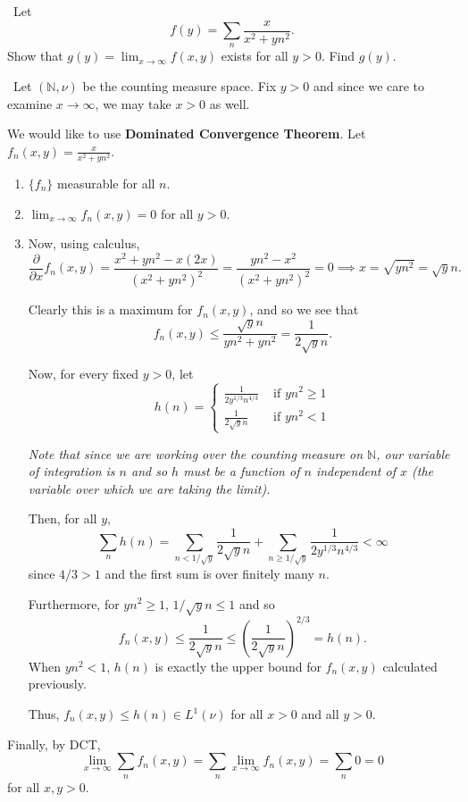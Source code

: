 \documentclass[12pt]{Homework}
\begin{document}
\begin{problem} $\,$
Let $$f(y)=\sum_n\frac{x}{x^2+yn^2}.$$ Show that $g(y)=\lim_{x\to\infty}f(x,y)$ exists for all $y>0$. Find $g(y)$.
\end{problem}


\begin{solution}$\,$
Let $(\mathbb{N},\nu)$ be the counting measure space. Fix $y>0$ and since we care to examine $x\to\infty$, we may take $x>0$ as well. 

We would like to use \textbf{Dominated Convergence Theorem}. Let $f_n(x,y)=\frac{x}{x^2+yn^2}$.
\begin{enumerate}
    \item $\{f_n\}$ measurable for all $n.$
    \item $\lim_{x\to\infty}f_n(x,y)= 0$ for all $y>0$.
    \item Now, using calculus, $$\frac{\partial}{\partial x}f_n(x,y)=\frac{x^2+yn^2-x(2x)}{(x^2+yn^2)^2}=\frac{yn^2-x^2}{(x^2+yn^2)^2}=0\implies x=\sqrt{yn^2}=\sqrt{y}n.$$
    
    Clearly this is a maximum for $f_n(x,y)$, and so we see that $$f_n(x,y)\le \frac{\sqrt{y}n}{yn^2+yn^2}=\frac{1}{2\sqrt{y}n}.$$
    
    Now, for every fixed $y>0$, let \[
    h(n)=\begin{cases}
    \frac{1}{2y^{1/3}n^{4/3}} & \text{ if } yn^2\ge 1\\
    \frac{1}{2\sqrt{y}n} & \text{ if } yn^2<1
    \end{cases}
    \]
    
    \textit{Note that since we are working over the counting measure on $\mathbb{N}$, our variable of integration is $n$ and so $h$ must be a function of $n$ independent of $x$ (the variable over which we are taking the limit).}
    
    Then, for all $y$, $$\sum_n h(n)=\sum_{n<1/\sqrt{y}}\frac{1}{2\sqrt{y}n}+\sum_{n\ge 1/\sqrt{y}}\frac{1}{2y^{1/3}n^{4/3}}<\infty$$ since $4/3>1$ and the first sum is over finitely many $n$. 
    
    Furthermore, for $yn^2\ge 1$, $1/\sqrt{y}n\le 1$ and so $$f_n(x,y)\le \frac{1}{2\sqrt{y}n}\le \left(\frac{1}{2\sqrt{y}n}\right)^{2/3}=h(n).$$ When $yn^2<1$, $h(n)$ is exactly the upper bound for $f_n(x,y)$ calculated previously.
    
    Thus, $f_n(x,y)\le h(n)\in L^1(\nu)$ for all $x>0$ and all $y>0$.
\end{enumerate}
Finally, by DCT, $$\lim_{x\to\infty} \sum_nf_n(x,y)=\sum_n\lim_{x\to\infty} f_n(x,y)=\sum_n0=0$$ for all $x,y>0$.
\end{solution}
\newpage
\end{document}
